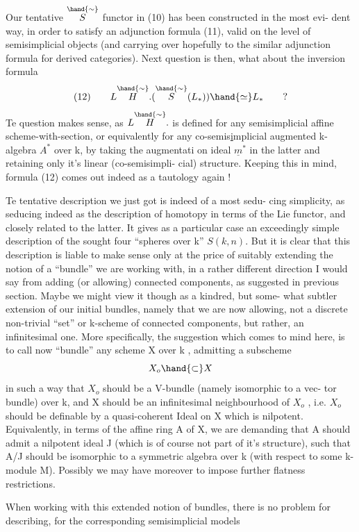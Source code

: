 
Our tentative $\overset{\hand{\sim}}{S}$ functor in (10) has been constructed in the most evi-%
dent way,  in order to satisfy an adjunction formula (11),  valid on
the level of semisimplicial objects  (and carrying over\hand{,} hopefully\hand{,}
to the similar adjunction formula for  derived categories).
Next question is then,  what about the inversion formula
\[
(12)\qquad L\overset{\hand{\sim}}{H}.(\overset{\hand{\sim}}{S}(L_*))\hand{\simeq} L_* \qquad ?
\]
Te question makes sense,  as  $L\overset{\hand{\sim}}{H}.$  is  defined for any
semisimplicial affine scheme-with-section, or equivalently for any
co-semis\uline{i}mplicial augmented k-algebra $A^*$ over k,  by taking the augmentati%
on ideal  $\underline{m}^*$  in the latter and retaining only it's linear (co-semisimpli-%
cial) structure.  Keeping this in mind,  formula (12) comes out indeed as
a tautology again !

Te  tentative description we just got is indeed of a most sedu-%
cing simplicity,  as seducing indeed as the description of homotopy in
terms of the Lie functor,  and closely related to the latter.  It gives
as a particular case an exceedingly simple description of the sought
four ``spheres over k''  $S(k,n)$.  But it is clear that this description is
liable to make sense only at the price of suitably extending the notion
of a ``bundle'' we are working with,  in a rather different direction I
would say from adding (or allowing) connected components, as suggested in
previous section.  Maybe we might view it though as a kindred,  but some-%
what subtler extension of our initial bundles,  namely that we are
now allowing,  not a discrete non-trivial ``set'' or k-scheme of connected
components,  but rather,  an infinitesimal one.  More specifically,
the suggestion which comes to mind here,  is to call now ``bundle''  any
scheme  X over  k ,  admitting a subscheme
\[
X_o \hand{\subset} X
\]
in such a way that $X_o$ should be a V-bundle (namely isomorphic to a vec-%
tor bundle) over k,  and X should be an infinitesimal neighbourhood of
$X_o$ ,  i.e. $X_o$ should be definable by a quasi-coherent Ideal  on X which
is nilpotent.  Equivalently,  in terms of the affine ring A of X,  we
are demanding that A should admit a nilpotent ideal J (which is of course
not part of it's structure),  such that A/J should be isomorphic to a
symmetric algebra over k (with respect to some k-module M).  Possibly
we may have moreover to impose further flatness restrictions.

When working with this extended notion of bundles,  there is no
problem for describing,  for the corresponding semisimplicial models



